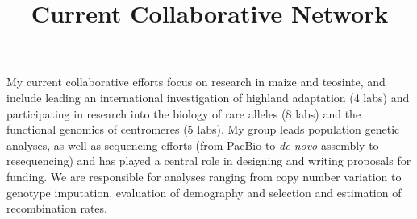 \documentclass[11pt,letterpaper]{article}
\title{Current Collaborative Network}
\date{}
\begin{document}
\maketitle
\noindent My current collaborative efforts focus on research in maize and teosinte, and include leading an international investigation of highland adaptation (4 labs) and participating in research into the biology of rare alleles (8 labs) and the functional genomics of centromeres (5 labs). 
My group leads population genetic analyses, as well as sequencing efforts (from PacBio to \emph{de novo} assembly to resequencing) and has played a central role in designing and writing proposals for funding. We are responsible for analyses ranging from copy number variation to genotype imputation, evaluation of demography and selection and estimation of recombination rates.
\end{document}

